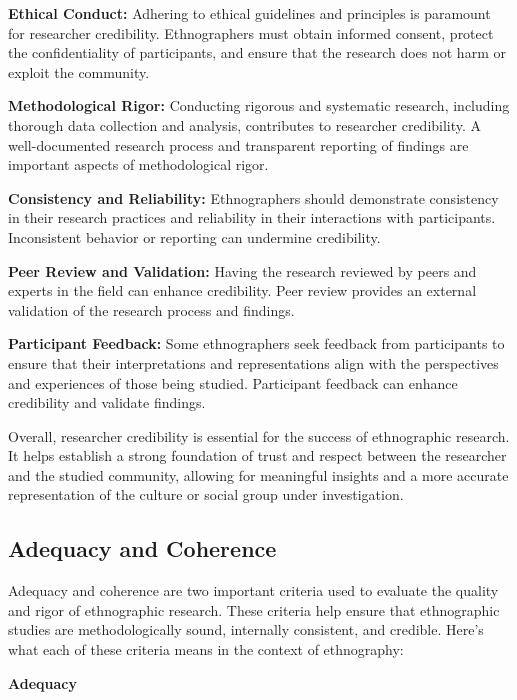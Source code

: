 \documentclass[
  b5paper]{book}
\begin{document}
\textbf{Ethical Conduct:} Adhering to ethical guidelines and principles is paramount for researcher credibility. Ethnographers must obtain informed consent, protect the confidentiality of participants, and ensure that the research does not harm or exploit the community.

\textbf{Methodological Rigor:} Conducting rigorous and systematic research, including thorough data collection and analysis, contributes to researcher credibility. A well-documented research process and transparent reporting of findings are important aspects of methodological rigor.

\textbf{Consistency and Reliability:} Ethnographers should demonstrate consistency in their research practices and reliability in their interactions with participants. Inconsistent behavior or reporting can undermine credibility.

\textbf{Peer Review and Validation:} Having the research reviewed by peers and experts in the field can enhance credibility. Peer review provides an external validation of the research process and findings.

\textbf{Participant Feedback:} Some ethnographers seek feedback from participants to ensure that their interpretations and representations align with the perspectives and experiences of those being studied. Participant feedback can enhance credibility and validate findings.

Overall, researcher credibility is essential for the success of ethnographic research. It helps establish a strong foundation of trust and respect between the researcher and the studied community, allowing for meaningful insights and a more accurate representation of the culture or social group under investigation.

\hypertarget{adequacy-and-coherence}{%
\subsection*{Adequacy and Coherence}\label{adequacy-and-coherence}}

Adequacy and coherence are two important criteria used to evaluate the quality and rigor of ethnographic research. These criteria help ensure that ethnographic studies are methodologically sound, internally consistent, and credible. Here's what each of these criteria means in the context of ethnography:

\textbf{Adequacy}
\end{document}
